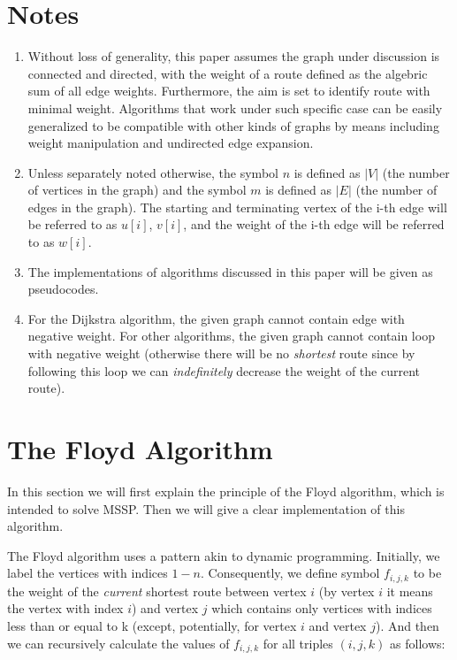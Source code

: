 \documentclass[a4paper,11pt,twocolumn]{article}
\begin{document}
\section{Notes}

\begin{enumerate}

\item{Without loss of generality, this paper assumes the graph under discussion is connected and directed, with the weight of a route defined as the algebric sum of all edge weights. Furthermore, the aim is set to identify route with minimal weight. Algorithms that work under such specific case can be easily generalized to be compatible with other kinds of graphs by means including weight manipulation and undirected edge expansion. }

\item{Unless separately noted otherwise, the symbol $n$ is defined as $|V|$ (the number of vertices in the graph) and the symbol $m$ is defined as $|E|$ (the number of edges in the graph). The starting and terminating vertex of the i-th edge will be referred to as $u[i]$, $v[i]$, and the weight of the i-th edge will be referred to as $w[i]$. }

\item{The implementations of algorithms discussed in this paper will be given as pseudocodes. }

\item{For the Dijkstra algorithm, the given graph cannot contain edge with negative weight. For other algorithms, the given graph cannot contain loop with negative weight (otherwise there will be no \emph{shortest} route since by following this loop we can \emph{indefinitely} decrease the weight of the current route). }

\end{enumerate}

\section{The Floyd Algorithm}

In this section we will first explain the principle of the Floyd algorithm, which is intended to solve MSSP. Then we will give a clear implementation of this algorithm.

The Floyd algorithm uses a pattern akin to dynamic programming. Initially, we label the vertices with indices $1-n$. Consequently, we  define symbol $f_{i,j,k}$ to be the weight of the \emph{current} shortest route between vertex $i$ (by vertex $i$ it means the vertex with index $i$) and vertex $j$ which contains only vertices with indices less than or equal to k (except, potentially, for vertex $i$ and vertex $j$). And then we can recursively calculate the values of $f_{i,j,k}$ for all triples $(i,j,k)$ as follows:
\end{document}
